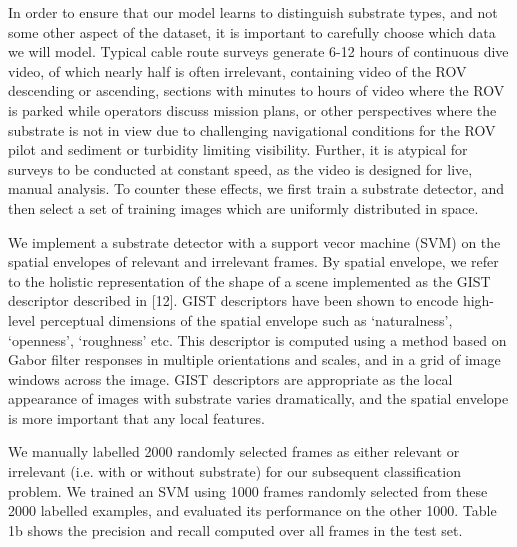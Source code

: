 In order to ensure that our model learns to distinguish substrate types, and not some other aspect of the dataset, it is important to carefully choose which data we will model. Typical cable route surveys generate 6-12 hours of continuous dive video, of which nearly half is often irrelevant, containing video of the ROV descending or ascending, sections with minutes to hours of video where the ROV is parked while operators discuss mission plans, or other perspectives where the substrate is not in view due to challenging navigational conditions for the ROV pilot and sediment or turbidity limiting visibility. Further, it is atypical for surveys to be conducted at constant speed, as the video is designed for live, manual analysis. To counter these effects, we first train a substrate detector, and then select a set of training images which are uniformly distributed in space.

We implement a substrate detector with a support vecor machine (SVM) on the spatial envelopes of relevant and irrelevant frames.
By spatial envelope, we refer to the holistic representation of the shape of a scene implemented as the GIST
descriptor described in [12]. GIST descriptors have been shown to encode high-level perceptual dimensions of the
spatial envelope such as ‘naturalness’, ‘openness’, ‘roughness’ etc. This descriptor is computed using a method based on Gabor filter responses in multiple orientations and scales, and in a grid of image windows across the image. GIST descriptors are appropriate as the local appearance of images with substrate varies dramatically, and the spatial envelope is more important that any local features.

We manually labelled 2000 randomly selected frames as either relevant or irrelevant (i.e. with or without substrate) for our subsequent classification problem. We trained an SVM using 1000 frames randomly selected from these 2000 labelled examples, and evaluated its performance on the other 1000. Table 1b shows the precision and recall computed over all frames in the test set.

